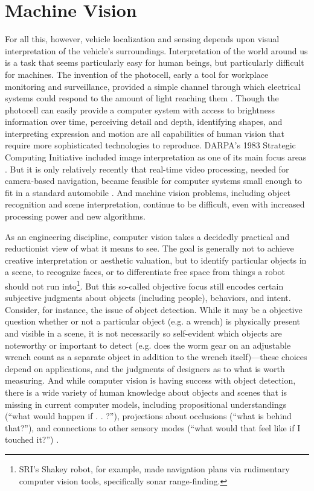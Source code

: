 \section{Machine Vision}
For all this, however, vehicle localization and sensing depends upon
visual interpretation of the vehicle's surroundings. Interpretation of
the world around us is a task that seems
particularly easy for human beings, but particularly difficult for
machines. The invention of the photocell, early a tool for workplace
monitoring and surveillance, provided a simple channel through which
electrical systems could respond to the amount of light reaching
them\cite[p. 44]{faxed} \cite[p. 361]{nyeElectrifying}. Though the photocell can easily
provide a computer system 
with access to brightness information over time, perceiving detail and
depth, identifying shapes, and interpreting expression and motion are
all capabilities of human vision that require more sophisticated
technologies to reproduce. DARPA's 1983 Strategic Computing Initiative
included image interpretation as one of its main
focus areas \cite[Afterword]{mccorduck}. But it is only relatively recently that real-time video
processing, needed for camera-based navigation, became feasible for computer
systems small enough to fit in a standard automobile \cite{vamors-p}. And machine
vision problems, including object recognition and scene
interpretation, continue to be difficult, even with increased
processing power and new algorithms. 

As an engineering discipline, computer vision takes a decidedly
practical and reductionist view of what it means to see. The goal is
generally not to achieve creative interpretation or aesthetic
valuation, but to identify particular objects in a scene, to recognize
faces, or to differentiate free space from things a robot should
not run into\footnote{SRI's Shakey robot, for example, made navigation
  plans via rudimentary computer vision tools, specifically sonar range-finding.}. But this so-called objective focus still encodes
certain subjective judgments about objects (including people),
behaviors, and intent. Consider, for instance, the issue of object
detection. While it may be a objective question whether or not a
particular object (e.g. a wrench) is physically present and visible in
a scene, it is not
necessarily so self-evident which objects are noteworthy or important
to detect (e.g. does the worm gear on an adjustable wrench count as a
separate object in addition
to the wrench itself)---these choices depend on applications, and the judgments of
designers as to what is worth measuring. And while computer vision is having success
with object detection, there is a wide variety of human knowledge
about objects and scenes that is missing in current computer
models, including propositional understandings (``what would happen if
. . ?''), projections about occlusions (``what is behind that?''), and
connections to other sensory modes (``what would that feel like if I
touched it?'') \cite{gomesJordan}.

